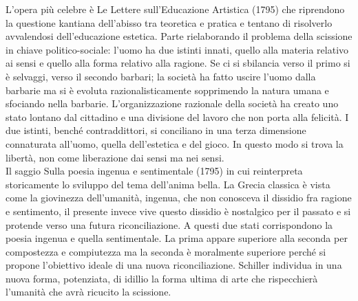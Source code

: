 \documentclass[10pt,a4paper]{article}
\begin{document}
L'opera più celebre è Le Lettere sull'Educazione Artistica (1795) che riprendono la questione kantiana dell'abisso tra teoretica e pratica e tentano di risolverlo avvalendosi dell'educazione estetica. Parte rielaborando il problema della scissione in chiave politico-sociale: l'uomo ha due istinti innati, quello alla materia relativo ai sensi e quello alla forma relativo alla ragione. Se ci si sbilancia verso il primo si è selvaggi, verso il secondo barbari; la società ha fatto uscire l'uomo dalla barbarie ma si è evoluta razionalisticamente sopprimendo la natura umana e sfociando nella barbarie. L'organizzazione razionale della società ha creato uno stato lontano dal cittadino e una divisione del lavoro che non porta alla felicità. I due istinti, benché contraddittori, si conciliano in una terza dimensione connaturata all'uomo, quella dell'estetica e del gioco. In questo modo si trova la libertà, non come liberazione dai sensi ma nei sensi.\\
Il saggio Sulla poesia ingenua e sentimentale (1795) in cui reinterpreta storicamente lo sviluppo del tema dell'anima bella. La Grecia classica è vista come la giovinezza dell'umanità, ingenua, che non conosceva il dissidio fra ragione e sentimento, il presente invece vive questo dissidio è nostalgico per il passato e si protende verso una futura riconciliazione. A questi due stati corrispondono la poesia ingenua e quella sentimentale. La prima appare superiore alla seconda per compostezza e compiutezza ma la seconda è moralmente superiore perché si propone l'obiettivo ideale di una nuova riconciliazione. Schiller individua in una nuova forma, potenziata, di idillio la forma ultima di arte che rispecchierà l'umanità che avrà ricucito la scissione. 
\end{document}

